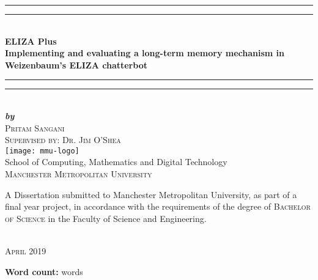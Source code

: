 %
%


\begin{titlepage}
	\begin{center}
	\rule[0.5ex]{\linewidth}{2pt}\vspace*{-\baselineskip}\vspace*{3.2pt}
	\rule[0.5ex]{\linewidth}{1pt}\\[\baselineskip]
	\vspace{6mm}
	{\Huge \textbf{ELIZA Plus}}\\
	\vspace{6mm}
	{\Large \textbf{Implementing and evaluating a long-term memory mechanism in Weizenbaum's ELIZA chatterbot}}\\
	\vspace{8mm}
	\rule[0.5ex]{\linewidth}{1pt}\vspace*{-\baselineskip}\vspace{3.5pt}
	\rule[0.5ex]{\linewidth}{2pt}\\
	\vspace{6.5mm}
	{\large \textbf{\textit{by}}}\\
	\vspace{6.5mm}
	{\large\textsc{Pritam Sangani}}\\
	\vspace{6.5mm}
 	{\large\textsc{Supervised by: Dr. Jim O'Shea}}\\
	\vspace{11mm}
	\texttt{[image: mmu-logo]}\\
	\vspace{6mm}
	{\large School of Computing, Mathematics and Digital Technology\\
	\textsc{Manchester Metropolitan University}}\\
	\vspace{11mm}
	\begin{minipage}{10cm}
		\begin{center}
			{A Dissertation submitted to Manchester Metropolitan University, 
			as part of a final year project, in accordance with the requirements of the degree of 
			\textsc{Bachelor of Science} in the Faculty of Science and Engineering.}
		\end{center}
	\end{minipage}\\
	\vspace{9mm}
	{\textsc{April 2019}}
	\vspace{8mm}
	\end{center}
	\vspace{9mm}
	\begin{flushright}
	{\small \textbf{Word count:} \numberstringnum{\wordcount} words}
	\end{flushright}
\end{titlepage}